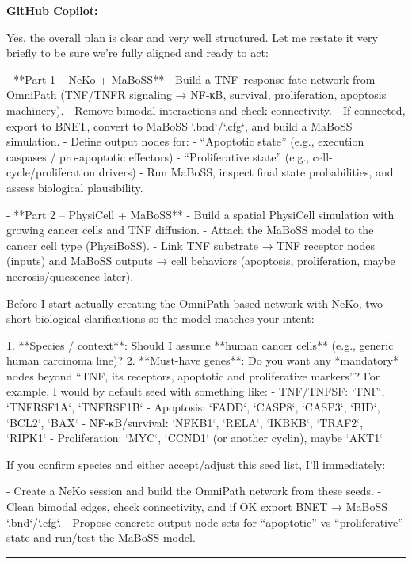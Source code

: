 \documentclass[11pt,a4paper]{article}
\begin{document}
\begin{copilotbox}
\textbf{GitHub Copilot:}

Yes, the overall plan is clear and very well structured. Let me restate it very briefly to be sure we’re fully aligned and ready to act:

- **Part 1 – NeKo + MaBoSS**
  - Build a TNF–response fate network from OmniPath (TNF/TNFR signaling → NF-κB, survival, proliferation, apoptosis machinery).
  - Remove bimodal interactions and check connectivity.
  - If connected, export to BNET, convert to MaBoSS `.bnd`/`.cfg`, and build a MaBoSS simulation.
  - Define output nodes for:
    - “Apoptotic state” (e.g., execution caspases / pro-apoptotic effectors)
    - “Proliferative state” (e.g., cell-cycle/proliferation drivers)
  - Run MaBoSS, inspect final state probabilities, and assess biological plausibility.

- **Part 2 – PhysiCell + MaBoSS**
  - Build a spatial PhysiCell simulation with growing cancer cells and TNF diffusion.
  - Attach the MaBoSS model to the cancer cell type (PhysiBoSS).
  - Link TNF substrate → TNF receptor nodes (inputs) and MaBoSS outputs → cell behaviors (apoptosis, proliferation, maybe necrosis/quiescence later).

Before I start actually creating the OmniPath-based network with NeKo, two short biological clarifications so the model matches your intent:

1. **Species / context**: Should I assume **human cancer cells** (e.g., generic human carcinoma line)?
2. **Must-have genes**: Do you want any *mandatory* nodes beyond “TNF, its receptors, apoptotic and proliferative markers”?  
   For example, I would by default seed with something like:
   - TNF/TNFSF: `TNF`, `TNFRSF1A`, `TNFRSF1B`
   - Apoptosis: `FADD`, `CASP8`, `CASP3`, `BID`, `BCL2`, `BAX`
   - NF-κB/survival: `NFKB1`, `RELA`, `IKBKB`, `TRAF2`, `RIPK1`
   - Proliferation: `MYC`, `CCND1` (or another cyclin), maybe `AKT1`

If you confirm species and either accept/adjust this seed list, I’ll immediately:

- Create a NeKo session and build the OmniPath network from these seeds.
- Clean bimodal edges, check connectivity, and if OK export BNET → MaBoSS `.bnd`/`.cfg`.
- Propose concrete output node sets for “apoptotic” vs “proliferative” state and run/test the MaBoSS model.

\end{copilotbox}
\bigskip\hrule\bigskip
\end{document}
